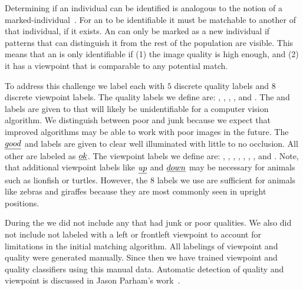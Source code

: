             Determining if an individual can be identified is analogous
              to the notion of a
              marked-individual~\cite{seber_estimation_1982}.
            For an \annot{} to be identifiable it must be matchable
              to another \annot{} of that individual, if it exists.
            An \annot{} can only be marked as a new individual if
              patterns that can distinguish it from the rest of the
              population are visible.
            This means that an \annot{} is only identifiable if
            (1) the image quality is high enough, and
            (2) it has a viewpoint that is comparable to any potential
              match.

            To address this challenge we label each \annot{} with $5$ discrete
              quality labels and $8$ discrete viewpoint labels.
            The quality labels we define are:
            \qualJunk{}, \qualPoor{}, \qualOk{}, \qualGood{}, and
              \qualExcellent{}.
            The \qualJunk{} and \qualPoor{} labels are given to \annots{} that
              will likely be unidentifiable for a computer vision algorithm.
            We distinguish between poor and junk because we expect that
              improved algorithms may be able to work with poor images in the
              future.
            The $\emph{good}{}$ and \qualExcellent{} labels are given to clear
              well illuminated \annots{} with little to no occlusion.
            All other \annots{} are labeled as $\emph{ok}$.
            The viewpoint labels we define are:
            \vpFront{}, \vpFrontLeft{}, \vpLeft{}, \vpBackLeft{}, \vpBack{},
              \vpBackRight{}, \vpBack{}, and \vpFrontRight{}.
            Note, that additional viewpoint labels like $\emph{up}{}$ and
              $\emph{down}{}$ may be necessary for animals such as lionfish or
              turtles.
            However, the $8$ labels we use are sufficient for animals like
              zebras and giraffes because they are most commonly seen in upright
              positions.

            During the \GZC{} we did not include any \annot{} that had junk or
              poor qualities.
            We also did not include \annots{} not labeled with a left or
              frontleft viewpoint to account for limitations in the initial
              matching algorithm.
            All labelings of viewpoint and quality were generated manually.
            Since then we have trained viewpoint and quality classifiers using
              this manual data.
            Automatic detection of quality and viewpoint is discussed in Jason
              Parham's work~\cite{parham_photographic_2015}.


